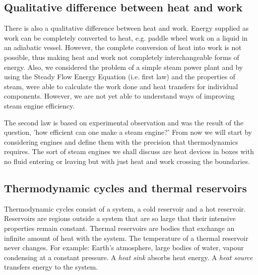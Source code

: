 \subsection{Qualitative difference between heat and work}
There is also a qualitative difference between heat and work. Energy supplied as work can be completely converted to heat, e.g. paddle wheel work on a liquid in an adiabatic vessel. However, the complete conversion of heat into work is not possible, thus making heat and work not completely interchangeable forms of energy. Also, we considered the problem of a simple steam power plant and by using the Steady Flow Energy Equation (i.e. first law) and the properties of steam, were able to calculate the work done and heat transfers for individual components. However, we are not yet able to understand ways of improving steam engine efficiency.

The second law is based on experimental observation and was the result of the question, 'how efficient can one make a steam engine?' From now we will start by considering engines and define them with the precision that thermodynamics requires. The sort of steam engines we shall discuss are heat devices in boxes with no fluid entering or leaving but with just heat and work crossing the boundaries.
\subsection{Thermodynamic cycles and thermal reservoirs}
Thermodynamic cycles consist of a system, a cold reservoir and a hot reservoir. Reservoirs are regions outside a system that are so large that their intensive properties remain constant. Thermal reservoirs are bodies that exchange an infinite amount of heat with the system. The temperature of a thermal reservoir never changes. For example: Earth's atmosphere, large bodies of water, vapour condensing at a constant pressure. A \emph{heat sink} absorbs heat energy. A \emph{heat source} transfers energy to the system.
